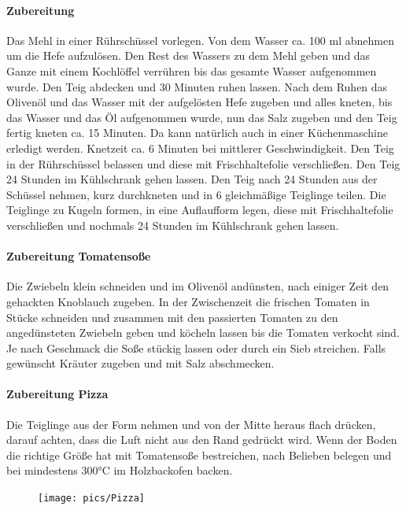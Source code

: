 \paragraph{Zubereitung }
Das Mehl in einer Rührschüssel vorlegen. Von dem Wasser ca. 100 ml 
abnehmen um die Hefe aufzulösen. Den Rest des Wassers zu dem Mehl 
geben 
und das Ganze mit einem Kochlöffel verrühren bis das gesamte Wasser 
aufgenommen wurde. Den Teig  abdecken und 30 Minuten ruhen lassen. Nach 
dem Ruhen das Olivenöl und das Wasser mit der aufgelösten Hefe zugeben und 
alles kneten, bis das Wasser und das Öl aufgenommen wurde, nun das Salz 
zugeben und den Teig fertig kneten ca. 15 Minuten. Da kann natürlich auch in 
einer Küchenmaschine erledigt werden. Knetzeit ca. 6 Minuten bei mittlerer 
Geschwindigkeit.
Den Teig in der Rührschüssel belassen und diese mit Frischhaltefolie 
verschließen. Den Teig 24 Stunden im Kühlschrank gehen lassen. Den Teig 
nach 24 Stunden aus der Schüssel nehmen, kurz durchkneten und in 6 
gleichmäßige Teiglinge teilen. Die Teiglinge zu Kugeln formen, in eine 
Auflaufform legen, diese mit Frischhaltefolie verschließen und nochmals 24 
Stunden im Kühlschrank gehen lassen. 

\paragraph{Zubereitung Tomatensoße}
Die Zwiebeln klein schneiden und im Olivenöl andünsten, nach einiger Zeit den 
gehackten Knoblauch zugeben. In der Zwischenzeit die frischen Tomaten in 
Stücke schneiden und zusammen mit den passierten Tomaten zu den 
angedünsteten Zwiebeln geben und köcheln lassen bis die Tomaten verkocht 
sind. Je nach Geschmack die Soße stückig lassen oder durch ein Sieb streichen.
Falls gewünscht Kräuter zugeben und mit Salz abschmecken.

\paragraph{Zubereitung Pizza}
Die Teiglinge aus der Form nehmen und von der Mitte heraus flach drücken, 
darauf achten, dass die Luft nicht aus den Rand gedrückt wird. Wenn der Boden 
die richtige Größe hat mit Tomatensoße bestreichen, nach Belieben belegen 
und bei mindestens 300°C im Holzbackofen backen.
\newpage

\begin{figure}[htbp]
	\centering
	\begin{minipage}{1\textwidth}
		\centering
		\texttt{[image: pics/Pizza]}
		\label{fig:Pizza}
	\end{minipage}
\end{figure}
\newpage

